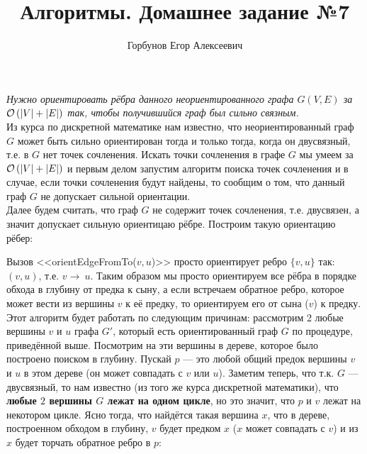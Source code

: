 
\title{Алгоритмы. Домашнее задание №7}
\author{Горбунов Егор Алексеевич}


\maketitle

\textit{Нужно ориентировать рёбра данного неориентированного графа $G(V,E)$ за $\mathcal{O}\left(|V|+|E|\right)$ так, чтобы получившийся граф был сильно связным.}\\
Из курса по дискретной математике нам известно, что неориентированный граф $G$ может быть сильно ориентирован тогда и
только тогда, когда он двусвязный, т.е. в $G$ нет точек сочленения. Искать точки сочленения в графе $G$ мы умеем за 
$\mathcal{O}\left(|V|+|E|\right)$ и первым делом запустим алгоритм поиска точек сочленения и в случае, если точки сочленения будут найдены, то сообщим о том, что данный граф $G$ не допускает сильной ориентации.\\
Далее будем считать, что граф $G$ не содержит точек сочленения, т.е. двусвязен, а значит допускает сильную ориентицаю
рёбре. Построим такую ориентацию рёбер:

\begin{algorithmic}
		\EndIf
	\EndFor
\EndProcedure
\end{algorithmic}
Вызов <<orientEdgeFromTo($v,u$)>> просто ориентирует ребро $\lbrace v, u \rbrace$ так: $(v,u)$, т.е. $v\rightarrow~u$.
Таким образом мы просто ориентируем все рёбра в порядке обхода в глубину от предка к сыну, а если встречаем обратное ребро, которое может вести из вершины $v$ к её предку, то ориентируем его от сына ($v$) к предку.\\
Этот алгоритм будет работать по следующим причинам: рассмотрим 2 любые вершины $v$ и $u$ графа $G'$, который 
есть ориентированный граф $G$ по процедуре, приведённой выше. Посмотрим на эти вершины в дереве, которое было построено поиском в глубину. Пускай $p$ --- это любой общий предок вершины $v$ и $u$ в этом дереве (он  может совпадать с $v$ или $u$).
Заметим теперь, что т.к. $G$ --- двусвязный, то нам известно (из того же курса дискретной математики), что \textbf{любые $2$ вершины $G$ лежат на одном цикле}, но 
это значит, что $p$ и $v$ лежат на некотором цикле. Ясно тогда, что найдётся такая вершина $x$, что в дереве, построенном обходом в глубину, $v$ будет предком $x$ ($x$ может совпадать с $v$) и из $x$ будет торчать обратное ребро
в $p$:

